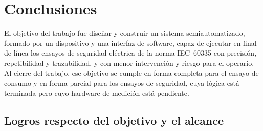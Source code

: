 \section{Conclusiones}
\label{sec:conclusiones}

El objetivo del trabajo fue diseñar y construir un sistema semiautomatizado,
formado por un dispositivo y una interfaz de software, capaz de ejecutar en final
de línea los ensayos de seguridad eléctrica de la norma IEC~60335 con precisión,
repetibilidad y trazabilidad, y con menor intervención y riesgo para el operario.
Al cierre del trabajo, ese objetivo se cumple en forma completa para el ensayo de
consumo y en forma parcial para los ensayos de seguridad, cuya lógica está
terminada pero cuyo hardware de medición está pendiente.

\subsection{Logros respecto del objetivo y el alcance}

